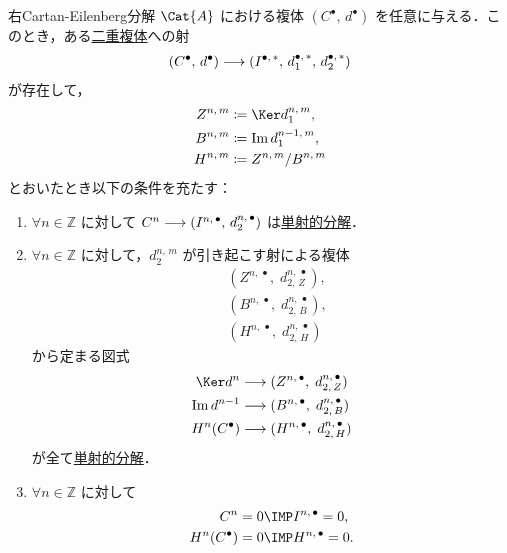 \documentclass[algtopo_main]{subfiles}
\begin{document}
\begin{myprop}[label=prop:Cartan-Eilenberg-R, breakable]{右Cartan-Eilenberg分解}
    $\Cat{A}$ における複体 $(C^\bullet,\, d^\bullet)$ を任意に与える．このとき，ある\hyperref[def:double-complex]{二重複体}への射
    \begin{align}
        (C^\bullet,\, d^\bullet) \longrightarrow (I^{\bullet,\, *},\, d_1^{\bullet,\, *},\, d_2^{\bullet,\, *}) \label{eq:morphism-doublecplx}
    \end{align} 
    が存在して，
    \begin{align}
        Z^{n,\, m} &\coloneqq \Ker d_1^{n,\, m}, \\
        B^{n,\, m} &\coloneqq \Im d_1^{n-1,\, m}, \\
        H^{n,\, m} &\coloneqq  Z^{n,\, m} /  B^{n,\, m}
    \end{align}
    とおいたとき以下の条件を充たす：
    \begin{enumerate}
        \item $\forall n \in \mathbb{Z}$ に対して $C^n \longrightarrow (I^{n,\,\bullet},\, d_2^{n,\, \bullet})$ は\hyperref[def:injective-resolution]{単射的分解}．
        \item $\forall n \in \mathbb{Z}$ に対して，$d_2^{n,\, m}$ が引き起こす射による複体
        \begin{align}
            &(Z^{n,\, \bullet},\; d_{2,\,Z}^{n,\, \bullet}),\\
            &(B^{n,\, \bullet},\; d_{2,\,B}^{n,\, \bullet}),\\ 
            &(H^{n,\, \bullet},\; d_{2,\,H}^{n,\, \bullet})
        \end{align}
        から定まる図式
        \begin{align}
            \Ker d^n &\lto (Z^{n,\, \bullet},\; d_{2,\,Z}^{n,\, \bullet}) \\
            \Im d^{n-1} &\lto (B^{n,\, \bullet},\; d_{2,\,B}^{n,\, \bullet}) \\
            H^n(C^\bullet) &\lto (H^{n,\, \bullet},\; d_{2,\,H}^{n,\, \bullet}) \\
        \end{align}
        が全て\hyperref[def:projective-resolution]{単射的分解}．
        \item $\forall n \in \mathbb{Z}$ に対して
        \begin{align}
            C^{n} = 0 &\IMP I^{n,\, \bullet} = 0, \\
            H^{n}(C^\bullet) = 0 &\IMP H^{n,\, \bullet} = 0.
        \end{align}
    \end{enumerate}
\end{myprop}
\end{document}
